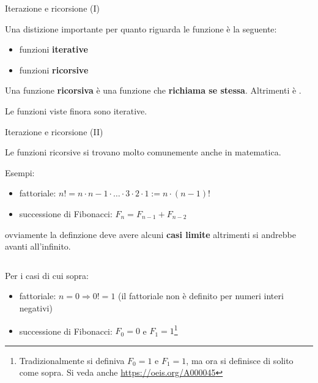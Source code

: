 \begin{frame}{Iterazione e ricorsione (I)}

  Una distizione importante per quanto riguarda le funzione è la
  seguente:
  \begin{itemize}
   \item funzioni \textbf{iterative}
   \item funzioni \textbf{ricorsive}
  \end{itemize}
  
  Una funzione \alert{\textbf{ricorsiva}} è una funzione che
  \textbf{richiama se stessa}. Altrimenti è .

  Le funzioni viste finora sono iterative.
\end{frame}

\begin{frame}{Iterazione e ricorsione (II)}

  Le funzioni ricorsive si trovano molto comunemente anche in matematica.
  
  Esempi:
  \begin{itemize}
   \item fattoriale: $n! = n \cdot n - 1 \cdot \dots \cdot 3 \cdot 2 \cdot 1 := n \cdot (n - 1)!$
   \item successione di Fibonacci: $F_{n} = F_{n-1} + F_{n-2}$
  \end{itemize}
  ovviamente la definzione deve avere alcuni \textbf{casi limite} altrimenti si andrebbe
  avanti all'infinito.

  ${}$\newline

  \begin{minipage}{0.8\paperwidth}
    Per i casi di cui sopra:
    \begin{itemize}
      \item fattoriale: $n = 0 \Rightarrow 0! = 1$ (il fattoriale non è definito per numeri interi negativi)
      \item successione di Fibonacci: $F_{0} = 0$ e $F_{1} = 1$\footnote{Tradizionalmente si definiva 
	    $F_{0} = 1$ e $F_{1} = 1$, ma ora si definisce di solito come sopra. Si veda anche \url{https://oeis.org/A000045}}
    \end{itemize}
  \end{minipage}

\end{frame}

